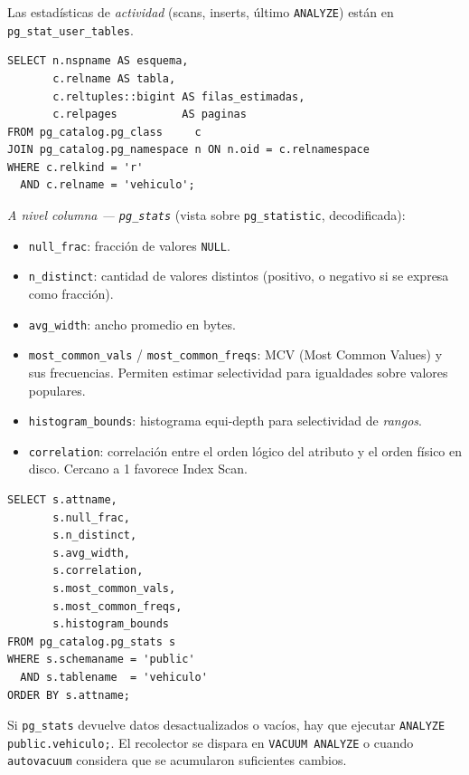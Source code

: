 \documentclass[11pt,a4paper]{article}
\begin{document}
Las estadísticas de \emph{actividad} (scans, inserts, último \texttt{ANALYZE}) están en \texttt{pg\_stat\_user\_tables}.

\begin{lstlisting}
SELECT n.nspname AS esquema,
       c.relname AS tabla,
       c.reltuples::bigint AS filas_estimadas,
       c.relpages          AS paginas
FROM pg_catalog.pg_class     c
JOIN pg_catalog.pg_namespace n ON n.oid = c.relnamespace
WHERE c.relkind = 'r'
  AND c.relname = 'vehiculo';
\end{lstlisting}

\textit{A nivel columna --- \texttt{pg\_stats}} (vista sobre \texttt{pg\_statistic}, decodificada):

\begin{itemize}
    \item \texttt{null\_frac}: fracción de valores \texttt{NULL}.
    \item \texttt{n\_distinct}: cantidad de valores distintos (positivo, o negativo si se expresa como fracción).
    \item \texttt{avg\_width}: ancho promedio en bytes.
    \item \texttt{most\_common\_vals} / \texttt{most\_common\_freqs}: MCV (Most Common Values) y sus frecuencias. Permiten estimar selectividad para igualdades sobre valores populares.
    \item \texttt{histogram\_bounds}: histograma equi-depth para selectividad de \emph{rangos}.
    \item \texttt{correlation}: correlación entre el orden lógico del atributo y el orden físico en disco. Cercano a 1 favorece Index Scan.
\end{itemize}

\begin{lstlisting}
SELECT s.attname,
       s.null_frac,
       s.n_distinct,
       s.avg_width,
       s.correlation,
       s.most_common_vals,
       s.most_common_freqs,
       s.histogram_bounds
FROM pg_catalog.pg_stats s
WHERE s.schemaname = 'public'
  AND s.tablename  = 'vehiculo'
ORDER BY s.attname;
\end{lstlisting}

\begin{nota}
Si \texttt{pg\_stats} devuelve datos desactualizados o vacíos, hay que ejecutar \texttt{ANALYZE public.vehiculo;}. El recolector se dispara en \texttt{VACUUM ANALYZE} o cuando \texttt{autovacuum} considera que se acumularon suficientes cambios.
\end{nota}
\end{document}
